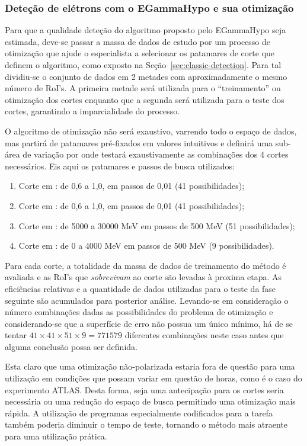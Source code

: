 \subsubsection{Deteção de elétrons com o EGammaHypo e sua otimização}
\label{sec:eghypo}

Para que a qualidade deteção do algoritmo proposto pelo EGammaHypo seja
estimada, deve-se passar a massa de dados de estudo por um processo de
otimização que ajude o especialista a selecionar os patamares de corte que
definem o algoritmo, como exposto na Seção~\ref{sec:classic-detection}. Para
tal dividiu-se o conjunto de dados em 2 metades com aproximadamente o mesmo
número de RoI's. A primeira metade será utilizada para o ``treinamento'' ou
otimização dos cortes enquanto que a segunda será utilizada para o teste dos
cortes, garantindo a imparcialidade do processo.

O algoritmo de otimização não será exaustivo, varrendo todo o espaço de dados,
mas partirá de patamares pré-fixados em valores intuitivos e definirá uma
sub-área de variação por onde testará exaustivamente as combinações dos 4
cortes necessários. Eis aqui os patamares e passos de busca utilizados:

\begin{enumerate}
\item Corte em \rcore: de 0,6 a 1,0, em passos de 0,01 (41 possibilidades);
\item Corte em \eratio: de 0,6 a 1,0, em passos de 0,01 (41 possibilidades);
\item Corte em \etem: de 5000 a 30000 MeV em passos de 500 MeV (51
possibilidades);
\item Corte em \ethad: de 0 a 4000 MeV em passos de 500 MeV (9
possibilidades). 
\end{enumerate}

Para cada corte, a totalidade da massa de dados de treinamento do método é
avaliada e as RoI's que \textit{sobrevivam} ao corte são levadas à proxima
etapa. As eficiências relativas e a quantidade de dados utilizadas para o teste
da fase seguinte são acumulados para posterior análise. Levando-se em
consideração o número combinações dadas as possibilidades do problema de
otimização e considerando-se que a superfície de erro não possua um único
mínimo, há de se tentar $41 \times 41 \times 51 \times 9 = 771579$ diferentes
combinações neste caso antes que alguma conclusão possa ser definida. 

Esta claro que uma otimização não-polarizada estaria fora de questão para uma
utilização em condições que possam variar em questão de horas, como é o caso do
experimento ATLAS. Desta forma, seja uma antecipação para os cortes seria
necessária ou uma redução do espaço de busca permitindo uma otimização mais
rápida. A utilização de programas especialmente codificados para a tarefa
também poderia diminuir o tempo de teste, tornando o método mais atraente para
uma utilização prática.

